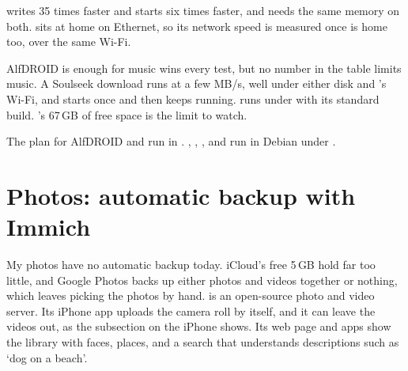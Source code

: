 \documentclass[11pt,a4paper]{article}
\begin{document}
 writes 35 times faster and starts  six times faster, and  needs the same memory on both.  sits at home on Ethernet, so its network speed is measured once  is home too, over the same Wi-Fi.

\begin{result}{AlfDROID is enough for music}
 wins every test, but no number in the table limits music. A Soulseek download runs at a few MB/s, well under either disk and 's Wi-Fi, and  starts once and then keeps running.  runs under  with its standard build. 's 67\,GB of free space is the limit to watch.
\end{result}

\begin{result}{The plan for AlfDROID}
 and  run in . , , , and  run in Debian under .
\end{result}

\section{Photos: automatic backup with Immich}

My photos have no automatic backup today. iCloud's free 5\,GB hold far too little, and Google Photos backs up either photos and videos together or nothing, which leaves picking the photos by hand.  is an open-source photo and video server. Its iPhone app uploads the camera roll by itself, and it can leave the videos out, as the subsection on the iPhone shows. Its web page and apps show the library with faces, places, and a search that understands descriptions such as ‘dog on a beach’.
\end{document}
